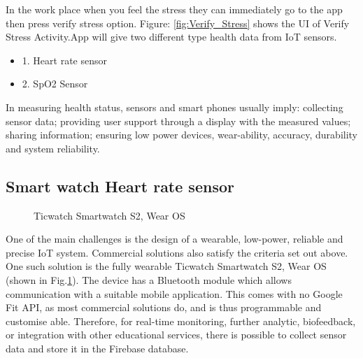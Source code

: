 In the work place when you feel the stress they can immediately go to the app then press verify stress option. Figure: \ref{fig:Verify_Stress} shows the UI of Verify Stress Activity.App will give two different type health data from \acs{IoT} sensors.

\begin{itemize}
    \item 1. Heart rate sensor
    \item 2. \acf{SpO2} Sensor
\end{itemize}

In measuring health status, sensors and smart phones usually imply: collecting sensor data; providing user support through a display with the measured values; sharing information; ensuring low power devices, wear-ability, accuracy, durability and system reliability.

\subsection{Smart watch Heart rate sensor}
\begin{figure}[hbt!] 
  \centering
  \qquad
  \caption[Ticwatch Smartwatch S2, Wear OS ]{Ticwatch Smartwatch S2, Wear OS}
  \label{fig:Ticwatch}
\end{figure}
One of the main challenges is the design of a wearable, low-power, reliable and precise \acs{IoT} system. Commercial solutions also satisfy the criteria set out above.  One such solution is the fully wearable Ticwatch Smartwatch S2, Wear OS (shown in Fig.\ref{fig:Ticwatch}). The device has a Bluetooth module which allows communication with a suitable mobile application. This comes with no Google Fit API, as most commercial solutions do, and is thus programmable and customise able. Therefore, for real-time monitoring, further analytic, biofeedback, or integration with other educational services, there is possible to collect sensor data and store it in the Firebase database.

